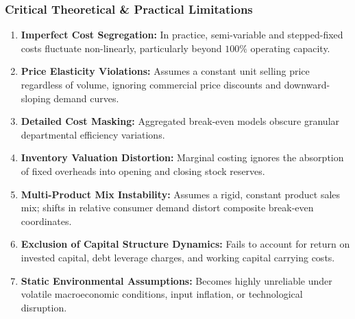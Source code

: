 \subsubsection{Critical Theoretical \& Practical Limitations}
\begin{enumerate}[leftmargin=*, topsep=2pt, itemsep=2pt]
    \item \textbf{Imperfect Cost Segregation:} In practice, semi-variable and stepped-fixed costs fluctuate non-linearly, particularly beyond $100\%$ operating capacity.
    \item \textbf{Price Elasticity Violations:} Assumes a constant unit selling price regardless of volume, ignoring commercial price discounts and downward-sloping demand curves.
    \item \textbf{Detailed Cost Masking:} Aggregated break-even models obscure granular departmental efficiency variations.
    \item \textbf{Inventory Valuation Distortion:} Marginal costing ignores the absorption of fixed overheads into opening and closing stock reserves.
    \item \textbf{Multi-Product Mix Instability:} Assumes a rigid, constant product sales mix; shifts in relative consumer demand distort composite break-even coordinates.
    \item \textbf{Exclusion of Capital Structure Dynamics:} Fails to account for return on invested capital, debt leverage charges, and working capital carrying costs.
    \item \textbf{Static Environmental Assumptions:} Becomes highly unreliable under volatile macroeconomic conditions, input inflation, or technological disruption.
\end{enumerate}

